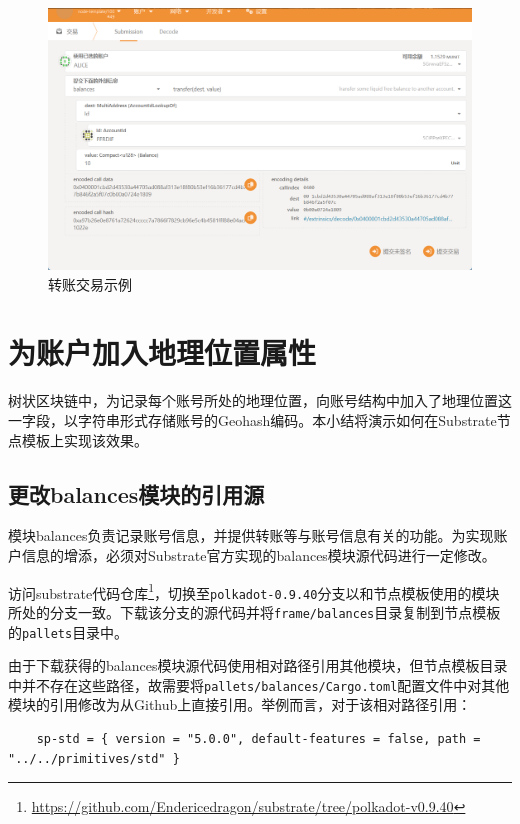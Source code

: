 \begin{figure}[htbp]
    \centering
    \includegraphics[width=\textwidth]{images/substrateTransfer.png}
    \caption{转账交易示例}\label{转账交易示例} %
\end{figure}

\section{为账户加入地理位置属性}

树状区块链中，为记录每个账号所处的地理位置，向账号结构中加入了地理位置这一字段，以字符串形式存储账号的Geohash编码。本小结将演示如何在Substrate节点模板上实现该效果。

\subsection{更改balances模块的引用源}

模块balances负责记录账号信息，并提供转账等与账号信息有关的功能。为实现账户信息的增添，必须对Substrate官方实现的balances模块源代码进行一定修改。

访问substrate代码仓库\footnote{\url{https://github.com/Endericedragon/substrate/tree/polkadot-v0.9.40}}，切换至\verb|polkadot-0.9.40|分支以和节点模板使用的模块所处的分支一致。下载该分支的源代码并将\verb|frame/balances|目录复制到节点模板的\verb|pallets|目录中。

由于下载获得的balances模块源代码使用相对路径引用其他模块，但节点模板目录中并不存在这些路径，故需要将\verb|pallets/balances/Cargo.toml|配置文件中对其他模块的引用修改为从Github上直接引用。举例而言，对于该相对路径引用：

\begin{lstlisting}
    sp-std = { version = "5.0.0", default-features = false, path = "../../primitives/std" }
\end{lstlisting}

